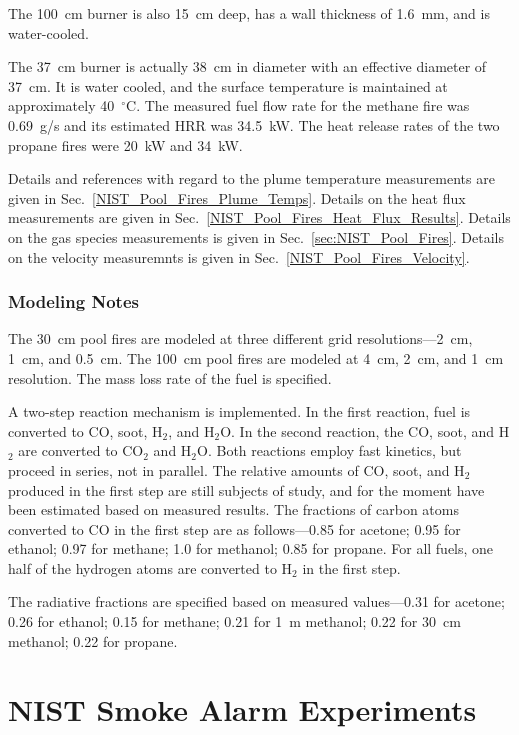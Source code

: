 The 100~cm burner is also 15~cm deep, has a wall thickness of 1.6~mm, and is water-cooled.

The 37~cm burner is actually 38~cm in diameter with an effective diameter of 37~cm. It is water cooled, and the surface temperature is maintained at approximately 40~$^\circ$C.  The measured fuel flow rate for the methane fire was 0.69~g/s and its estimated HRR was 34.5~kW. The heat release rates of the two propane fires were 20~kW and 34~kW.

Details and references with regard to the plume temperature measurements are given in Sec.~\ref{NIST_Pool_Fires_Plume_Temps}. Details on the heat flux measurements are given in Sec.~\ref{NIST_Pool_Fires_Heat_Flux_Results}. Details on the gas species measurements is given in Sec.~\ref{sec:NIST_Pool_Fires}. Details on the velocity measuremnts is given in Sec.~\ref{NIST_Pool_Fires_Velocity}.


\subsubsection{Modeling Notes}

The 30~cm pool fires are modeled at three different grid resolutions---2~cm, 1~cm, and 0.5~cm. The 100~cm pool fires are modeled at 4~cm, 2~cm, and 1~cm resolution. The mass loss rate of the fuel is specified.

A two-step reaction mechanism is implemented. In the first reaction, fuel is converted to CO, soot, H$_2$, and H$_2$O. In the second reaction, the CO, soot, and H$_2$ are converted to CO$_2$ and H$_2$O. Both reactions employ fast kinetics, but proceed in series, not in parallel. The relative amounts of CO, soot, and H$_2$ produced in the first step are still subjects of study, and for the moment have been estimated based on measured results. The fractions of carbon atoms converted to CO in the first step are as follows---0.85 for acetone; 0.95 for ethanol; 0.97 for methane; 1.0 for methanol; 0.85 for propane. For all fuels, one half of the hydrogen atoms are converted to H$_2$ in the first step.

The radiative fractions are specified based on measured values---0.31 for acetone; 0.26 for ethanol; 0.15 for methane; 0.21 for 1~m methanol; 0.22 for 30~cm methanol; 0.22 for propane.


\section{NIST Smoke Alarm Experiments}
\label{NIST_Smoke_Alarm_Description}

